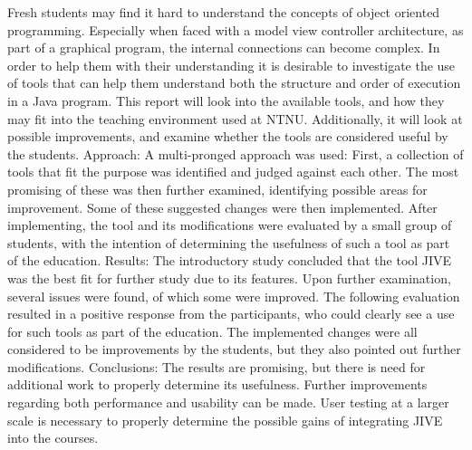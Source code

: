 Fresh students may find it hard to understand the concepts of object oriented programming.
Especially when faced with a model view controller architecture, as part of a graphical program, the internal connections can become complex.
In order to help them with their understanding it is desirable to investigate the use of tools that can help them understand both the structure and order of execution in a Java program.
This report will look into the available tools, and how they may fit into the teaching environment used at NTNU.
Additionally, it will look at possible improvements, and examine whether the tools are considered useful by the students.
Approach:
A multi-pronged approach was used: First, a collection of tools that fit the purpose was identified and judged against each other.
The most promising of these was then further examined, identifying possible areas for improvement.
Some of these suggested changes were then implemented.
After implementing, the tool and its modifications were evaluated by a small group of students, with the intention of determining the usefulness of such a tool as part of the education.
Results:
The introductory study concluded that the tool JIVE was the best fit for further study due to its features.
Upon further examination, several issues were found, of which some were improved.
The following evaluation resulted in a positive response from the participants, who could clearly see a use for such tools as part of the education.
The implemented changes were all considered to be improvements by the students, but they also pointed out further modifications.
Conclusions:
The results are promising, but there is need for additional work to properly determine its usefulness.
Further improvements regarding both performance and usability can be made.
User testing at a larger scale is necessary to properly determine the possible gains of integrating JIVE into the courses.